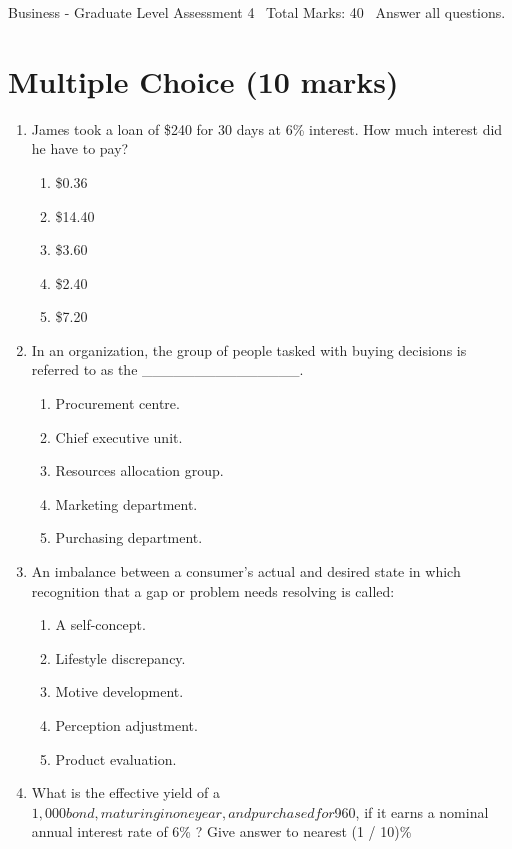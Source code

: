 \documentclass[12pt]{article}
\begin{document}
\begin{center}
Business - Graduate Level Assessment 4 \
Total Marks: 40 \
Answer all questions.
\end{center}

\section*{Multiple Choice (10 marks)}
\begin{enumerate}[label=\arabic*.]
\item James took a loan of \$240 for 30 days at 6\% interest. How much interest did he have to
pay?
\begin{enumerate}[label=(\alph*)]
    \item \$0.36
    \item \$14.40
    \item \$3.60
    \item \$2.40
    \item \$7.20
\end{enumerate}
\item In an organization, the group of people tasked with buying decisions is referred to as the
\_\_\_\_\_\_\_\_\_\_\_\_\_\_\_.
\begin{enumerate}[label=(\alph*)]
    \item Procurement centre.
    \item Chief executive unit.
    \item Resources allocation group.
    \item Marketing department.
    \item Purchasing department.
\end{enumerate}
\item An imbalance between a consumer's actual and desired state in which recognition that a gap
or problem needs resolving is called:
\begin{enumerate}[label=(\alph*)]
    \item A self-concept.
    \item Lifestyle discrepancy.
    \item Motive development.
    \item Perception adjustment.
    \item Product evaluation.
\end{enumerate}
\item What is the effective yield of a $1,000 bond, maturing in one year, and purchased for
$960, if it earns a nominal annual interest rate of 6\% ? Give answer to nearest (1 / 10)\%

\end{enumerate}
\end{document}
